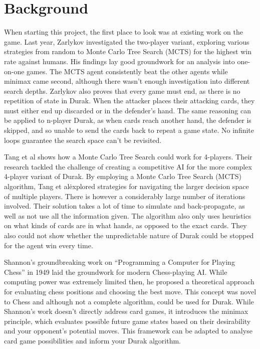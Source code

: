 \documentclass[a4paper, twoside, 12pt]{report}
\begin{document}
\chapter{Background}

When starting this project, the first place to look was at existing work on the game. Last year, Zarlykov\cite{azamat} investigated the two-player variant, exploring various strategies from random to Monte Carlo Tree Search (MCTS) for the highest win rate against humans. His findings lay good groundwork for an analysis into one-on-one games. The MCTS agent consistently beat the other agents while minimax came second, although there wasn't enough investigation into different search depths. Zarlykov also proves that every game must end, as there is no repetition of state in Durak. When the attacker places their attacking cards, they must either end up discarded or in the defender's hand. The same reasoning can be applied to n-player Durak, as when cards reach another hand, the defender is skipped, and so unable to send the cards back to repeat a game state. No infinite loops guarantee the search space can't be revisited.

Tang et al\cite{durakMonteCarlo} shows how a Monte Carlo Tree Search could work for 4-players. Their research tackled the challenge of creating a competitive AI for the more complex 4-player variant of Durak. By employing a Monte Carlo Tree Search (MCTS) algorithm, Tang et al\. explored strategies for navigating the larger decision space of multiple players. There is however a considerably large number of iterations involved. Their solution takes a lot of time to simulate and back-propagate, as well as not use all the information given. The algorithm also only uses heuristics on what kinds of cards are in what hands, as opposed to the exact cards. They also could not show whether the unpredictable nature of Durak could be stopped for the agent win every time.

Shannon's groundbreaking work on ``Programming a Computer for Playing Chess'' in 1949 laid the groundwork for modern Chess-playing AI\cite{shannon}. While computing power was extremely limited then, he proposed a theoretical approach for evaluating chess positions and choosing the best move. This concept was novel to Chess and although not a complete algorithm, could be used for Durak.  While Shannon's work doesn't directly address card games, it introduces the minimax principle, which evaluates possible future game states based on their desirability and your opponent's potential moves. This framework can be adapted to analyse card game possibilities and inform your Durak algorithm.
\end{document}

